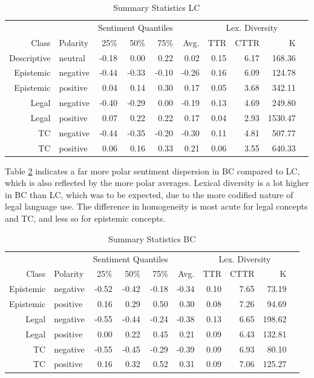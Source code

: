 \documentclass{article}
\begin{document}
\begin{table}[ht]
\centering
{}
\begin{tabular}{rlrrrrrrrr}
  & & \multicolumn{3}{c}{Sentiment Quantiles} & & \multicolumn{3}{c}{Lex. Diversity}\\
   \cmidrule{3-5} \cmidrule{7-9}
  Class & Polarity & 25\% & 50\% & 75\% & Avg. &  TTR & CTTR & K\\
  \bottomrule
Descriptive & neutral & -0.18 & 0.00 & 0.22 & 0.02 & 0.15 & 6.17 & 168.36 \\ 
  Epistemic & negative & -0.44 & -0.33 & -0.10 & -0.26 & 0.16 & 6.09 & 124.78 \\ 
  Epistemic & positive & 0.04 & 0.14 & 0.30 & 0.17 & 0.05 & 3.68 & 342.11 \\ 
  Legal & negative & -0.40 & -0.29 & 0.00 & -0.19 & 0.13 & 4.69 & 249.80 \\ 
  Legal & positive & 0.07 & 0.22 & 0.22 & 0.17 & 0.04 & 2.93 & 1530.47 \\ 
  TC & negative & -0.44 & -0.35 & -0.20 & -0.30 & 0.11 & 4.81 & 507.77 \\ 
  TC & positive & 0.06 & 0.16 & 0.33 & 0.21 & 0.06 & 3.55 & 640.33 \\ 
   \hline
\end{tabular}
\caption{Summary Statistics LC}
\label{tab:LCstats}
\end{table}

Table \ref{tab:BCstats} indicates a far more polar sentiment dispersion in BC compared to LC, which is also reflected by the more polar averages. Lexical diversity is a lot higher in BC than LC, which was to be expected, due to the more codified nature of legal language use. The difference in homogeneity is most acute for legal concepts and TC, and less so for epistemic concepts.

\begin{table}[ht]
\centering
{}
\begin{tabular}{rlrrrrrrrr}
  & & \multicolumn{3}{c}{Sentiment Quantiles} & & \multicolumn{3}{c}{Lex. Diversity}\\
   \cmidrule{3-5} \cmidrule{7-9}
  Class & Polarity & 25\% & 50\% & 75\% & Avg. &  TTR & CTTR & K\\
  \bottomrule
Epistemic & negative & -0.52 & -0.42 & -0.18 & -0.34 & 0.10 & 7.65 & 73.19 \\ 
  Epistemic & positive & 0.16 & 0.29 & 0.50 & 0.30 & 0.08 & 7.26 & 94.69 \\ 
  Legal & negative & -0.55 & -0.44 & -0.24 & -0.38 & 0.13 & 6.65 & 198.62 \\ 
  Legal & positive & 0.00 & 0.22 & 0.45 & 0.21 & 0.09 & 6.43 & 132.81 \\ 
  TC & negative & -0.55 & -0.45 & -0.29 & -0.39 & 0.09 & 6.93 & 80.10 \\ 
  TC & positive & 0.16 & 0.32 & 0.52 & 0.31 & 0.09 & 7.06 & 125.27 \\ 
   \hline
\end{tabular}
   \caption{Summary Statistics BC}
   \label{tab:BCstats}
\end{table}
\end{document}
